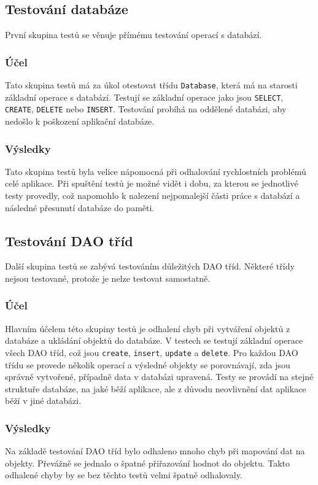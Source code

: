 \documentclass[thesis=B,czech]{resources/FITthesis}[2012/06/26]
\begin{document}
		\subsection{Testování databáze}
První skupina testů se věnuje přímému testování operací s databází. 
			\subsubsection*{Účel}
Tato skupina testů má za úkol otestovat třídu \texttt{Database}, která má na starosti základní operace s databází. Testují se základní operace jako jsou \texttt{SELECT}, \texttt{CREATE}, \texttt{DELETE} nebo \texttt{INSERT}. Testování probíhá na oddělené databázi, aby nedošlo k poškození aplikační databáze. 			

			\subsubsection*{Výsledky}
Tato skupina testů byla velice nápomocná při odhalování rychlostních problémů celé aplikace. Při spuštění testů je možné vidět i dobu, za kterou se jednotlivé testy provedly, což napomohlo k nalezení nejpomalejší části práce s databází a následné přesunutí databáze do paměti.

		\subsection{Testování DAO tříd}
Další skupina testů se zabývá testováním důležitých DAO tříd. Některé třídy nejsou testované, protože je nelze testovat samostatně.
			\subsubsection*{Účel}
Hlavním účelem této skupiny testů je odhalení chyb při vytváření objektů z databáze a ukládání objektů do databáze. V testech se testují základní operace všech DAO tříd, což jsou \texttt{create}, \texttt{insert}, \texttt{update} a \texttt{delete}. Pro každou DAO třídu se provede několik operací a výsledné objekty se porovnávají, zda jsou správně vytvořené, případně data v databázi upravená. Testy se provádí na stejné struktuře databáze, na jaké běží aplikace, ale z důvodu neovlivnění dat aplikace běží v jiné databázi.
			
			\subsubsection*{Výsledky}
Na základě testování DAO tříd bylo odhaleno mnoho chyb při mapování dat na objekty. Převážně se jednalo o špatné přiřazování hodnot do objektu. Takto odhalené chyby by se bez těchto testů velmi špatně odhalovaly.			
\end{document}
